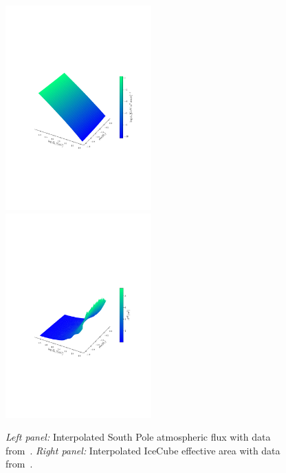 \documentclass{thesis}
\begin{document}
\begin{figure}[t]\label{fig:flux_aeff}
    \includegraphics[width=0.5\textwidth]{figures/flux.pdf}\hspace{-1cm}
    \includegraphics[width=0.5\textwidth]{figures/aeff.pdf}
    \vspace{-2.5cm}\caption{\emph{Left panel:} Interpolated South Pole atmospheric flux with data from~\cite{hondaArticle}.
    \emph{Right panel:} Interpolated IceCube effective area with data from~\cite{ICaeff}.}
\end{figure}
\end{document}
